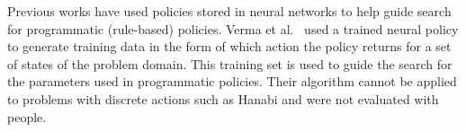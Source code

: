 \documentclass[letterpaper]{article} %
\begin{document}
Previous works have used policies stored in neural networks to help guide search for programmatic (rule-based) policies. Verma et al.~ used a trained neural policy to generate training data in the form of which action the policy returns for a set of states of the problem domain. This training set is used to guide the search for the parameters used in programmatic policies. Their algorithm cannot be applied to problems with discrete actions such as Hanabi and were not evaluated with people. 
 




 
\end{document}
